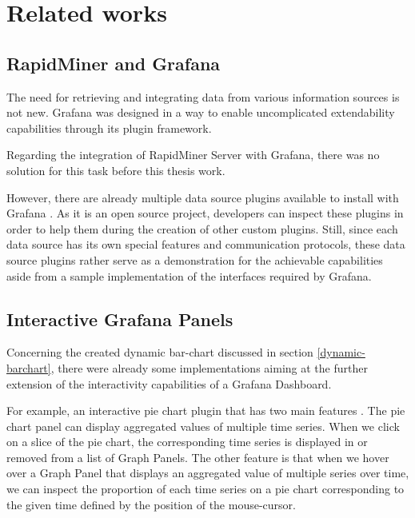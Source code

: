 \chapter{Related works}

%
%
%


\section{RapidMiner and Grafana}

The need for retrieving and integrating data from various information sources is not new. Grafana was designed in a way to enable uncomplicated extendability capabilities through its plugin framework.



Regarding the integration of RapidMiner Server with Grafana, there was no solution for this task before this thesis work.

However, there are already multiple data source plugins available to install with Grafana \cite{grafana-datasource-plugins}. As it is an open source project, developers can inspect these plugins in order to help them during the creation of other custom plugins. Still, since each data source has its own special features and communication protocols, these data source plugins rather serve as a demonstration for the achievable capabilities aside from a sample implementation of the interfaces required by Grafana.

\section{Interactive Grafana Panels}
%

Concerning the created dynamic bar-chart discussed in section \ref{dynamic-barchart}, there were already some implementations aiming at the further extension of the interactivity capabilities of a Grafana Dashboard.

For example, an interactive pie chart plugin that has two main features \cite{interactive-pie-chart}. The pie chart panel can display aggregated values of multiple time series. When we click on a slice of the pie chart, the corresponding time series is displayed in or removed from a list of Graph Panels. The other feature is that when we hover over a Graph Panel that displays an aggregated value of multiple series over time, we can inspect the proportion of each time series on a pie chart corresponding to the given time defined by the position of the mouse-cursor.


